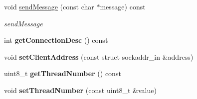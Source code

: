 \begin{DoxyCompactItemize}
void \hyperlink{classClientObject_a4704430f61bd85efd980c6ea083d5374}{send\+Message} (const char $\ast$message) const
\begin{DoxyCompactList}\small\item\em send\+Message \end{DoxyCompactList}\item 
\mbox{\label{classClientObject_a005f6a32946b325538add475a3245761}} 
int {\bfseries get\+Connection\+Desc} () const
\item 
\mbox{\label{classClientObject_a49c720a1b38e12ebad46f2e9c9cde1b1}} 
void {\bfseries set\+Client\+Address} (const struct sockaddr\+\_\+in \&address)
\item 
\mbox{\label{classClientObject_acad244c4aeef0346408bb6f5de2f0957}} 
uint8\+\_\+t {\bfseries get\+Thread\+Number} () const
\item 
\mbox{\label{classClientObject_a336868963702390ecd9fe94f7a6fbdf8}} 
void {\bfseries set\+Thread\+Number} (const uint8\+\_\+t \&value)
\end{DoxyCompactItemize}
